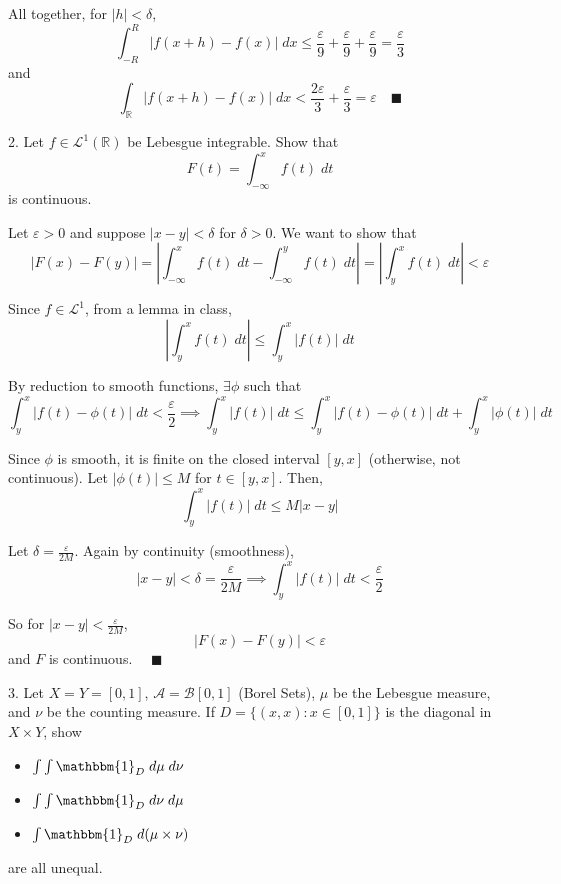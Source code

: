 \documentclass[12pt]{article}
\newcommand{\R}{\mathbb{R}}
\newcommand{\ind}{\mathbbm{1}}
\newcommand{\qed}{\quad \blacksquare}
\newcommand{\abs}[1]{\left\vert #1 \right\vert}
\newcommand{\ep}{\varepsilon}
\newcommand{\A}{\mathcal{A}}
\newcommand{\B}{\mathcal{B}}
\renewcommand{\L}{\mathcal{L}}
\begin{document}
        All together, for $\abs{h} < \delta$,
        \[\int_{-R}^{R} \abs{f(x+ h) - f(x)}\; dx \leq \frac{\ep}{9} + \frac{\ep}{9} + \frac{\ep}{9} = \frac{\ep}{3}\] 
        and 
        \[\int_{\R} \abs{f(x+ h) -f(x)}\; dx < \frac{2\ep}{3} + \frac{\ep}{3} = \ep \qed\]
    \color{black}
  
\pagebreak

2. Let $f \in \L^1(\R)$ be Lebesgue integrable. Show that 
\[F(t) = \int_{-\infty}^x f(t)\; dt\]
is continuous. 

    \color{blue}
        Let $\ep > 0$ and suppose $\abs{x - y} < \delta$ for $\delta > 0$. We want to show that 
        \[\abs{F(x) - F(y)} = \abs{\int_{-\infty}^x f(t)\; dt - \int_{-\infty}^y f(t)\; dt} = \abs{\int_y^x f(t)\; dt} < \ep\]

        Since $f \in \L^1$, from a lemma in class, 
        \[\abs{\int_y^x f(t)\; dt} \leq \int_y^x \abs{f(t)}\; dt\]

        By reduction to smooth functions, $\exists \phi$ such that
        \[\int_y^x \abs{f(t) - \phi(t)}\; dt < \frac{\ep}{2} \implies \int_y^x \abs{f(t)}\; dt \leq \int_y^x \abs{f(t) - \phi(t)}\; dt + \int_y^x \abs{\phi(t)}\; dt\]

        Since $\phi$ is smooth, it is finite on the closed interval $[y, x]$ (otherwise, not continuous). Let $\abs{\phi(t)} \leq M$ for $t \in [y, x]$. Then,
        \[\int_y^x \abs{f(t)} \;dt \leq M\abs{x - y}\] 

        Let $\delta = \frac{\ep}{2M}$. Again by continuity (smoothness), 
        \[\abs{x - y} < \delta = \frac{\ep}{2M} \implies \int_y^x \abs{f(t)}\; dt < \frac{\ep}{2}\] 

        So for $\abs{x - y} < \frac{\ep}{2M}$,
        \[\abs{F(x) - F(y)} < \ep\]
        and $F$ is continuous. $\qed$

    \color{black}

\pagebreak 

3. Let $X = Y = [0, 1]$, $\A = \B[0, 1]$ (Borel Sets), $\mu$ be the Lebesgue measure, and $\nu$ be the counting measure. If $D = \{(x, x): x \in [0, 1]\}$ is the diagonal in $X \times Y$, show 
\begin{itemize}
    \item $\int \int \ind_D \; d\mu \; d\nu$
    \item $\int \int \ind_D \; d\nu \; d\mu$
    \item $\int \ind_D \; d(\mu \times \nu)$
\end{itemize} 
are all unequal. 
\end{document}
